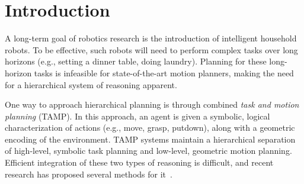 \section{Introduction}
A long-term goal of robotics research is the introduction of intelligent household robots.
To be effective, such robots will need to perform complex tasks
over long horizons (e.g., setting a dinner table, doing laundry). Planning for these long-horizon tasks is infeasible
for state-of-the-art motion planners, making the need
for a hierarchical system of reasoning apparent.

One way to approach hierarchical planning is through combined \emph{task and motion planning} (TAMP). In this
approach, an agent is given a symbolic, logical characterization of actions (e.g., move, grasp,
putdown), along with a geometric encoding of the environment. TAMP systems maintain a hierarchical
separation of high-level, symbolic task planning and low-level, geometric motion planning.
Efficient integration of these two types of reasoning is difficult, and recent research has
proposed several methods for it~\cite{srivastava2014combined, kaelbling2011hierarchical,
lagriffoul2014orientation, GarrettWAFR14, dornhege2012semantic}.

